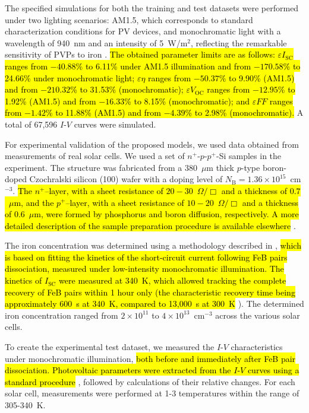 \documentclass[a4paper,fleqn,draft]{cas-sc}
\begin{document}
The specified simulations for both the training and test datasets were performed under two lighting scenarios:
AM1.5, which corresponds to standard characterization conditions for PV devices,
and monochromatic light with a wavelength of 940~nm and an intensity of 5~W/m$^{2}$,
reflecting the remarkable sensitivity of PVPs to iron \cite{Olikh2025MSEB}.
\textcolor[rgb]{1.00,0.07,0.00}{
\hl{
The obtained parameter limits are as follows:
$\varepsilon I_\mathrm{SC}$ ranges from $-40.88$\% to 6.11\% under AM1.5 illumination and
from $-170.58$\% to 24.66\% under monochromatic light;
$\varepsilon \eta$ ranges from $-50.37$\% to 9.90\% (AM1.5)
and from $-210.32$\% to 31.53\% (monochromatic);
$\varepsilon V_\mathrm{OC}$ ranges from $-12.95$\% to 1.92\%  (AM1.5) and
from $-16.33$\% to 8.15\% (monochromatic);
and $\varepsilon F\!F$ ranges from $-1.42$\% to 11.88\% (AM1.5) and
from $-4.39$\% to 2.98\% (monochromatic).
}}
A total of 67,596 $I$-$V$ curves were simulated.

For experimental validation of the proposed models, we used data obtained from measurements of real solar cells.
We used a set of $n^+$-$p$-$p^+$-Si samples in the experiment.
The structure was fabricated from a 380~$\mu$m thick $p$-type boron-doped Czochralski silicon (100) wafer
with a doping level of $N_\mathrm{B}=1.36\times10^{15}$~cm$^{-3}$.
\textcolor[rgb]{1.00,0.07,0.00}{
\hl{
The $n^+$--layer, with a sheet resistance of $20-30$~$\Omega/\Box$ and a thickness of $0.7$~$\mu$m,
and the $p^+$--layer, with a sheet resistance of $10-20$~$\Omega/\Box$ and a thickness of $0.6$~$\mu$m,
were formed by phosphorus and boron diffusion, respectively.
A more detailed description of the sample preparation procedure is available elsewhere} \cite{Olikh2021JAP}.
}

The iron concentration was determined using a methodology described in \cite{Olikh2022:JMatSci,Olikh2021JAP},
\textcolor[rgb]{1.00,0.07,0.00}{
\hl{
which is based on fitting the kinetics of the short-circuit current following FeB pairs dissociation,
measured under low-intensity monochromatic illumination.
The kinetics of $I_\mathrm{SC}$ were measured at 340~K, which allowed tracking the complete recovery of FeB pairs within 1 hour only
(the characteristic recovery time being approximately 600~s at 340~K, compared to 13,000~s at 300~K} \cite{FeBAssJAP2014,FeBKin2019}).}
The determined iron concentration ranged from $2\times10^{11}$ to $4\times10^{13}$~cm$^{-3}$ across the various solar cells.

To create the experimental test dataset, we measured the $I$-$V$ characteristics under monochromatic illumination,
\textcolor[rgb]{1.00,0.07,0.00}{
\hl{
both before and immediately after FeB pair dissociation.
Photovoltaic parameters were extracted from the $I$-$V$ curves using a standard procedure} \cite{SCparam2017},
followed by calculations of their relative changes.
For each solar cell, measurements were performed at 1-3 temperatures within the range of 305-340~K.
}
\end{document}
